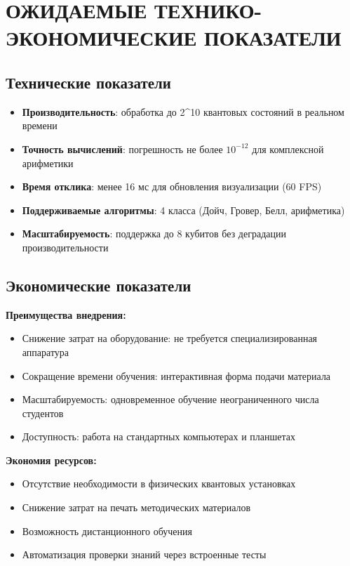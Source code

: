\documentclass[14pt,russian]{extarticle}
\begin{document}
\section{ОЖИДАЕМЫЕ ТЕХНИКО-ЭКОНОМИЧЕСКИЕ ПОКАЗАТЕЛИ}

\subsection{Технические показатели}

\begin{itemize}
    \item \textbf{Производительность}: обработка до 2^{10} квантовых состояний в реальном времени
    \item \textbf{Точность вычислений}: погрешность не более $10^{-12}$ для комплексной арифметики
    \item \textbf{Время отклика}: менее 16 мс для обновления визуализации (60 FPS)
    \item \textbf{Поддерживаемые алгоритмы}: 4 класса (Дойч, Гровер, Белл, арифметика)
    \item \textbf{Масштабируемость}: поддержка до 8 кубитов без деградации производительности
\end{itemize}

\subsection{Экономические показатели}

\textbf{Преимущества внедрения:}
\begin{itemize}
    \item Снижение затрат на оборудование: не требуется специализированная аппаратура
    \item Сокращение времени обучения: интерактивная форма подачи материала
    \item Масштабируемость: одновременное обучение неограниченного числа студентов
    \item Доступность: работа на стандартных компьютерах и планшетах
\end{itemize}

\textbf{Экономия ресурсов:}
\begin{itemize}
    \item Отсутствие необходимости в физических квантовых установках
    \item Снижение затрат на печать методических материалов
    \item Возможность дистанционного обучения
    \item Автоматизация проверки знаний через встроенные тесты
\end{itemize}
\end{document}
